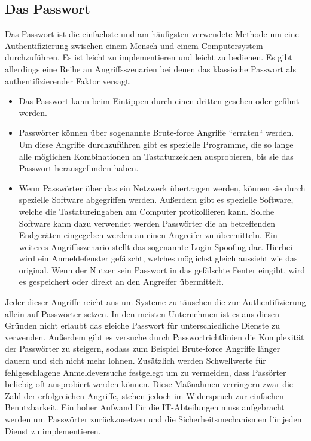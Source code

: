 \documentclass[
book,
a4paper,   
titlepage,  
halfparskip,
12pt        
]{scrartcl}
\begin{document}
\begin{onehalfspacing}
\subsection{Das Passwort}
\label{subsec:pass}
Das Passwort ist die einfachste und am häufigsten verwendete Methode um eine Authentifizierung zwischen einem Mensch und einem Computersystem durchzuführen. Es ist leicht zu implementieren und leicht zu bedienen. Es gibt allerdings eine Reihe an Angriffsszenarien bei denen das klassische Passwort als authentifizierender Faktor versagt.
\begin{itemize}
	\item Das Passwort kann beim Eintippen durch einen dritten gesehen oder gefilmt werden. 
	\item Passwörter können über sogenannte Brute-force Angriffe ``erraten`` werden. Um diese Angriffe durchzuführen gibt es spezielle Programme, die so lange alle möglichen Kombinationen an Tastaturzeichen ausprobieren, bis sie das Passwort herausgefunden haben. 
	\item Wenn Passwörter über das ein Netzwerk übertragen werden, können sie durch spezielle Software abgegriffen werden. Außerdem gibt es spezielle Software, welche die Tastatureingaben am Computer protkollieren kann. Solche Software kann dazu verwendet werden Passwörter die an betreffenden Endgeräten eingegeben werden an einen Angreifer zu übermitteln.
	Ein weiteres Angriffsszenario stellt das sogenannte Login Spoofing dar. Hierbei wird ein Anmeldefenster gefälscht, welches möglichst gleich aussieht wie das original. Wenn der Nutzer sein Passwort in das gefälschte Fenter eingibt, wird es gespeichert oder direkt an den Angreifer übermittelt. 
\end{itemize}
Jeder dieser Angriffe reicht aus um Systeme zu täuschen die zur Authentifizierung allein auf Passwörter setzen. In den meisten Unternehmen ist es aus diesen Gründen nicht erlaubt das gleiche Passwort für unterschiedliche Dienste zu verwenden. Außerdem gibt es versuche durch Passwortrichtlinien die Komplexität der Passwörter zu steigern, sodass zum Beispiel Brute-force Angriffe länger dauern und sich nicht mehr lohnen. Zusätzlich werden Schwellwerte für fehlgeschlagene Anmeldeversuche festgelegt um zu vermeiden, dass Passörter beliebig oft ausprobiert werden können. Diese Maßnahmen verringern zwar die Zahl der erfolgreichen Angriffe, stehen jedoch im Widerspruch zur einfachen Benutzbarkeit. Ein hoher Aufwand für die \ac{IT}-Abteilungen muss aufgebracht werden um Passwörter zurückzusetzen und die Sicherheitsmechanismen für jeden Dienst zu implementieren.\cite[S. 3ff]{hong}\\

\end{onehalfspacing}
\end{document}
